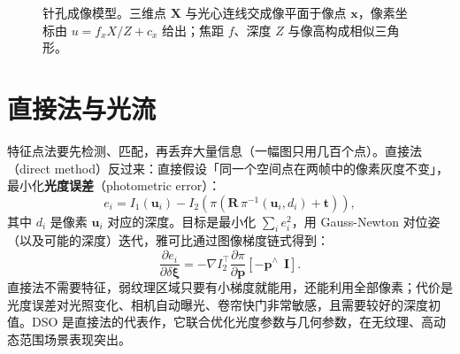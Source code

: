 \begin{figure}[htbp]
  \centering
  \caption{针孔成像模型。三维点 $\bm{X}$ 与光心连线交成像平面于像点 $\bm{x}$，像素坐标由 $u=f_xX/Z+c_x$ 给出；焦距 $f$、深度 $Z$ 与像高构成相似三角形。}
  \label{fig:08-pinhole}
\end{figure}

\section{直接法与光流}\label{sec:08-direct}

特征点法要先检测、匹配，再丢弃大量信息（一幅图只用几百个点）。直接法（direct method）反过来：直接假设「同一个空间点在两帧中的像素灰度不变」，最小化\textbf{光度误差}（photometric error）：
\begin{equation}
  e_{i} = I_1\left(\bm{u}_i\right)-I_2\left(\pi\left(\bm{R}\,\pi^{-1}\left(\bm{u}_i,d_i\right)+\bm{t}\right)\right),
  \label{eq:08-photometric}
\end{equation}
其中 $d_i$ 是像素 $\bm{u}_i$ 对应的深度。目标是最小化 $\sum_i e_i^{2}$，用 Gauss-Newton 对位姿（以及可能的深度）迭代，雅可比通过图像梯度链式得到：
\begin{equation}
  \frac{\partial e_i}{\partial\delta\bm{\xi}}
  = -\nabla I_2^{\top}\frac{\partial\pi}{\partial\bm{p}}\left[-\bm{p}^{\wedge}\ \ \bm{I}\right].
\end{equation}
直接法不需要特征，弱纹理区域只要有小梯度就能用，还能利用全部像素；代价是光度误差对光照变化、相机自动曝光、卷帘快门非常敏感，且需要较好的深度初值。DSO \cite{engel2018dso} 是直接法的代表作，它联合优化光度参数与几何参数，在无纹理、高动态范围场景表现突出。

